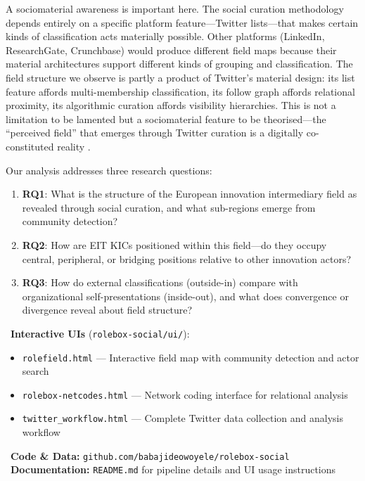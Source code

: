 \documentclass[../main.tex]{subfiles}
\begin{document}
A sociomaterial awareness is important here. The social curation methodology depends entirely on a specific platform feature---Twitter lists---that makes certain kinds of classification acts materially possible. Other platforms (LinkedIn, ResearchGate, Crunchbase) would produce different field maps because their material architectures support different kinds of grouping and classification. The field structure we observe is partly a product of Twitter's material design: its list feature affords multi-membership classification, its follow graph affords relational proximity, its algorithmic curation affords visibility hierarchies. This is not a limitation to be lamented but a sociomaterial feature to be theorised---the ``perceived field'' that emerges through Twitter curation is a digitally co-constituted reality \cite{scott2014entanglements}.

Our analysis addresses three research questions:

\begin{enumerate}
    \item \textbf{RQ1}: What is the structure of the European innovation intermediary field as revealed through social curation, and what sub-regions emerge from community detection?
    \item \textbf{RQ2}: How are EIT KICs positioned within this field---do they occupy central, peripheral, or bridging positions relative to other innovation actors?
    \item \textbf{RQ3}: How do external classifications (outside-in) compare with organizational self-presentations (inside-out), and what does convergence or divergence reveal about field structure?
\end{enumerate}

\begin{replicationbox}
\faLaptopCode\ \textbf{Interactive UIs} (\texttt{rolebox-social/ui/}):
\begin{itemize}[leftmargin=*, itemsep=0.1em]
    \item \texttt{rolefield.html} --- Interactive field map with community detection and actor search
    \item \texttt{rolebox-netcodes.html} --- Network coding interface for relational analysis
    \item \texttt{twitter\_workflow.html} --- Complete Twitter data collection and analysis workflow
\end{itemize}
\faGithub\ \textbf{Code \& Data:} \texttt{github.com/babajideowoyele/rolebox-social}\\
\faBook\ \textbf{Documentation:} \texttt{README.md} for pipeline details and UI usage instructions
\end{replicationbox}
\end{document}
